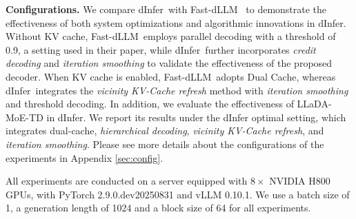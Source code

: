 \documentclass[]{antgroup}
\newcommand{\sys}{dInfer}
\newcommand{\fastdllm}{Fast-dLLM}
\newcommand{\lladamoe}{LLaDA-MoE}
\begin{document}
\textbf{Configurations.}
We compare \sys~with \fastdllm~\citep{wu2025fast} to demonstrate the effectiveness of both system optimizations and algorithmic innovations in \sys.
%
Without KV cache, \fastdllm~employs parallel decoding with a threshold of 0.9, a setting used in their paper, while \sys~further incorporates \textit{credit decoding} and \textit{iteration smoothing} to validate the effectiveness of the proposed decoder. %
%
When KV cache is enabled, \fastdllm~adopts Dual Cache, whereas \sys~integrates the \textit{vicinity KV-Cache refresh} method with \textit{iteration smoothing} and threshold decoding. %
In addition, we evaluate the effectiveness of \lladamoe-TD in \sys. We report its results under the dInfer optimal setting, which integrates dual-cache, \textit{hierarchical decoding}, \textit{vicinity KV-Cache refresh}, and \textit{iteration smoothing}. Please see more details about the configurations of the experiments in Appendix \ref{sec:config}.


    

All experiments are conducted on a server equipped with $8\times$ NVIDIA H800 GPUs, with PyTorch 2.9.0.dev20250831 and vLLM 0.10.1. 
We use a batch size of 1, a generation length of 1024 and a block size of 64 for all experiments.

\end{document}
